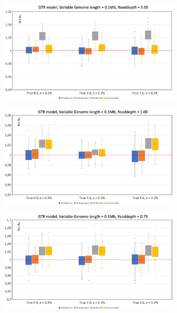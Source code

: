 \documentclass{article}
\begin{document}
\begin{figure}[h]
\begin{subfigure}[b]{0.475\textwidth}
         \caption{}
         \label{fig:GTRRD10_01Mb}
     \end{subfigure}
     \begin{subfigure}[b]{0.475\textwidth}
         \centering
         \includegraphics[width=\textwidth]{GTRRD5_01Mb.png}
         \caption{}
         \label{fig:GTRRD5_01Mb}
     \end{subfigure}
     \begin{subfigure}[b]{0.475\textwidth}
         \centering
         \includegraphics[width=\textwidth]{GTRRD1_01Mb.png}
         \caption{}
         \label{fig:GTRRD1_01Mb}
     \end{subfigure}
     \begin{subfigure}[b]{0.475\textwidth}
         \centering
         \includegraphics[width=\textwidth]{GTRRD075_01Mb.png}

\end{subfigure}
\end{figure}
\end{document}
